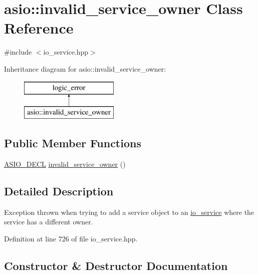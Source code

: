 \hypertarget{classasio_1_1invalid__service__owner}{}\section{asio\+:\+:invalid\+\_\+service\+\_\+owner Class Reference}
\label{classasio_1_1invalid__service__owner}


{\ttfamily \#include $<$io\+\_\+service.\+hpp$>$}

Inheritance diagram for asio\+:\+:invalid\+\_\+service\+\_\+owner\+:\begin{figure}[H]
\begin{center}
\leavevmode
\includegraphics[height=2.000000cm]{classasio_1_1invalid__service__owner}
\end{center}
\end{figure}
\subsection*{Public Member Functions}
\begin{DoxyCompactItemize}
\item 
\hyperlink{config_8hpp_ab54d01ea04afeb9a8b39cfac467656b7}{A\+S\+I\+O\+\_\+\+D\+E\+C\+L} \hyperlink{classasio_1_1invalid__service__owner_a3719b084346e471515b60c24804fe2c7}{invalid\+\_\+service\+\_\+owner} ()
\end{DoxyCompactItemize}


\subsection{Detailed Description}
Exception thrown when trying to add a service object to an \hyperlink{classasio_1_1io__service}{io\+\_\+service} where the service has a different owner. 

Definition at line 726 of file io\+\_\+service.\+hpp.



\subsection{Constructor \& Destructor Documentation}
\hypertarget{classasio_1_1invalid__service__owner_a3719b084346e471515b60c24804fe2c7}{}
